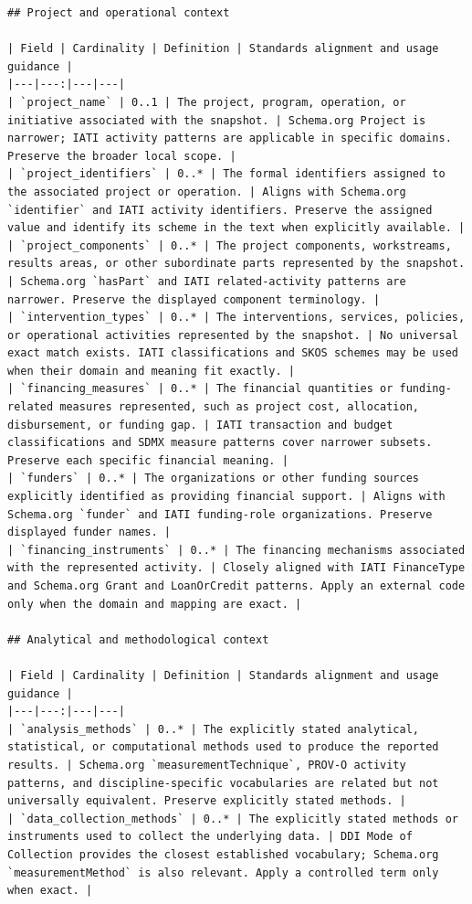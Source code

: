 \documentclass{article}
\begin{document}
\begin{lstlisting}
## Project and operational context

| Field | Cardinality | Definition | Standards alignment and usage guidance |
|---|---:|---|---|
| `project_name` | 0..1 | The project, program, operation, or initiative associated with the snapshot. | Schema.org Project is narrower; IATI activity patterns are applicable in specific domains. Preserve the broader local scope. |
| `project_identifiers` | 0..* | The formal identifiers assigned to the associated project or operation. | Aligns with Schema.org `identifier` and IATI activity identifiers. Preserve the assigned value and identify its scheme in the text when explicitly available. |
| `project_components` | 0..* | The project components, workstreams, results areas, or other subordinate parts represented by the snapshot. | Schema.org `hasPart` and IATI related-activity patterns are narrower. Preserve the displayed component terminology. |
| `intervention_types` | 0..* | The interventions, services, policies, or operational activities represented by the snapshot. | No universal exact match exists. IATI classifications and SKOS schemes may be used when their domain and meaning fit exactly. |
| `financing_measures` | 0..* | The financial quantities or funding-related measures represented, such as project cost, allocation, disbursement, or funding gap. | IATI transaction and budget classifications and SDMX measure patterns cover narrower subsets. Preserve each specific financial meaning. |
| `funders` | 0..* | The organizations or other funding sources explicitly identified as providing financial support. | Aligns with Schema.org `funder` and IATI funding-role organizations. Preserve displayed funder names. |
| `financing_instruments` | 0..* | The financing mechanisms associated with the represented activity. | Closely aligned with IATI FinanceType and Schema.org Grant and LoanOrCredit patterns. Apply an external code only when the domain and mapping are exact. |

## Analytical and methodological context

| Field | Cardinality | Definition | Standards alignment and usage guidance |
|---|---:|---|---|
| `analysis_methods` | 0..* | The explicitly stated analytical, statistical, or computational methods used to produce the reported results. | Schema.org `measurementTechnique`, PROV-O activity patterns, and discipline-specific vocabularies are related but not universally equivalent. Preserve explicitly stated methods. |
| `data_collection_methods` | 0..* | The explicitly stated methods or instruments used to collect the underlying data. | DDI Mode of Collection provides the closest established vocabulary; Schema.org `measurementMethod` is also relevant. Apply a controlled term only when exact. |


\end{lstlisting}
\end{document}
